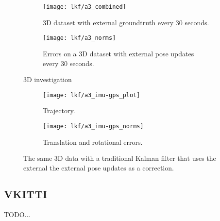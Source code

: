 \begin{figure}

\begin{subfigure}[]{0.9\textwidth}
    \centering
    \texttt{[image: lkf/a3\_combined]}
	\caption{3D dataset with external groundtruth every 30 seconds.}
	\label{fig:lkf_3d_combined}    
    \end{subfigure}
    
    \begin{subfigure}[]{0.9\textwidth}
	\centering
    \texttt{[image: lkf/a3\_norms]}
	\caption{Errors on a 3D dataset with external pose updates every 30 seconds.}
	\label{fig:lkf_3d_norms} 
	\end{subfigure}
	\label{fig:lkf_3d}
	\caption{3D investigation}
\end{figure}

\begin{figure}
\begin{subfigure}[]{0.9\textwidth}
    \centering
    \texttt{[image: lkf/a3\_imu-gps\_plot]}
	\caption{Trajectory.}
	\label{fig:lkf_imu-gps_plot}    
    \end{subfigure}
    
    \begin{subfigure}[]{0.9\textwidth}
	\centering
    \texttt{[image: lkf/a3\_imu-gps\_norms]}
	\caption{Translation and rotational errors.}
	\label{fig:lkf_imu-gps_norms} 
	\end{subfigure}
	\label{fig:lkf_3d_imu-gps}
	\caption{The same 3D data with a traditional Kalman filter that uses the external the external pose updates as a correction.}
\end{figure}

\subsection{VKITTI}

TODO...

 